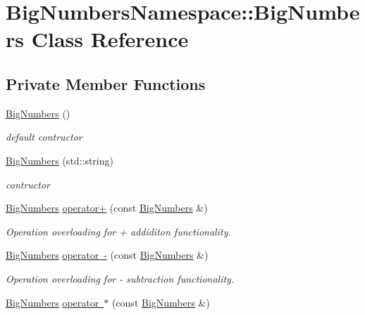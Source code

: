 \hypertarget{class_big_numbers_namespace_1_1_big_numbers}{}\section{Big\+Numbers\+Namespace\+::Big\+Numbers Class Reference}
\label{class_big_numbers_namespace_1_1_big_numbers}
\subsection*{Private Member Functions}
\begin{DoxyCompactItemize}
\item 
\mbox{\hyperlink{class_big_numbers_namespace_1_1_big_numbers_a5bfa6f3a7f04d3c7b3ace2105c1c1ffb}{Big\+Numbers}} ()
\begin{DoxyCompactList}\small\item\em default contructor \end{DoxyCompactList}\item 
\mbox{\hyperlink{class_big_numbers_namespace_1_1_big_numbers_a8bf0b6aa84bc1d96eab66887fbbee957}{Big\+Numbers}} (std\+::string)
\begin{DoxyCompactList}\small\item\em contructor \end{DoxyCompactList}\item 
\mbox{\hyperlink{class_big_numbers_namespace_1_1_big_numbers}{Big\+Numbers}} \mbox{\hyperlink{class_big_numbers_namespace_1_1_big_numbers_a4b074a7fd3903da94c9bd554608a45fa}{operator+}} (const \mbox{\hyperlink{class_big_numbers_namespace_1_1_big_numbers}{Big\+Numbers}} \&)
\begin{DoxyCompactList}\small\item\em Operation overloading for + addiditon functionality. \end{DoxyCompactList}\item 
\mbox{\hyperlink{class_big_numbers_namespace_1_1_big_numbers}{Big\+Numbers}} \mbox{\hyperlink{class_big_numbers_namespace_1_1_big_numbers_ae56e4ef1d3590c5127540e25f00a5ce2}{operator -\/}} (const \mbox{\hyperlink{class_big_numbers_namespace_1_1_big_numbers}{Big\+Numbers}} \&)
\begin{DoxyCompactList}\small\item\em Operation overloading for -\/ subtraction functionality. \end{DoxyCompactList}\item 
\mbox{\hyperlink{class_big_numbers_namespace_1_1_big_numbers}{Big\+Numbers}} \mbox{\hyperlink{class_big_numbers_namespace_1_1_big_numbers_a71a05e5a8eb4032a056d93f5006a6d73}{operator $\ast$}} (const \mbox{\hyperlink{class_big_numbers_namespace_1_1_big_numbers}{Big\+Numbers}} \&)

\end{DoxyCompactItemize}
